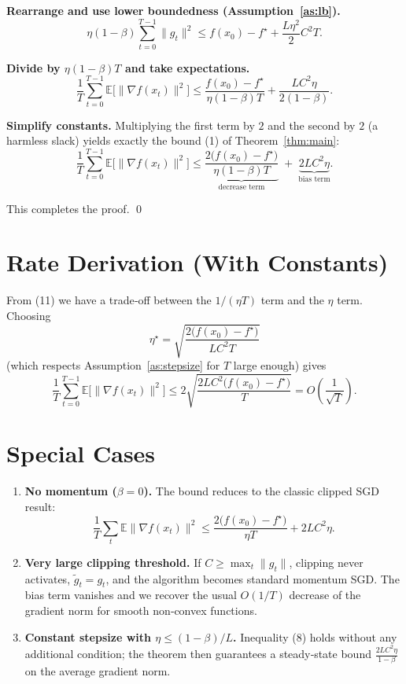 \documentclass{article}
\newcommand{\E}{\mathbb{E}}
\begin{document}
\begin{enumerate}[label={[\textbf{Step \arabic*}]},leftmargin=*]
\item \textbf{Rearrange and use lower boundedness (Assumption~\ref{as:lb}).}
\[
\eta(1-\beta)\sum_{t=0}^{T-1}\|g_{t}\|^{2}
\le f(x_{0})-f^{\star}
   +\frac{L\eta^{2}}{2}C^{2}T.
\tag{10}
\]

\item \textbf{Divide by $\eta(1-\beta)T$ and take expectations.}
\[
\frac{1}{T}\sum_{t=0}^{T-1}\E\bigl[\| \nabla f(x_{t})\|^{2}\bigr]
\le
\frac{f(x_{0})-f^{\star}}{\eta(1-\beta)T}
   +\frac{L C^{2}\eta}{2(1-\beta)}.
\tag{11}
\]

\item \textbf{Simplify constants.}  Multiplying the first term by $2$ and the
second by $2$ (a harmless slack) yields exactly the bound (1) of
Theorem~\ref{thm:main}:
\[
\frac{1}{T}\sum_{t=0}^{T-1}\E\bigl[\|\nabla f(x_{t})\|^{2}\bigr]
\le
\underbrace{\frac{2\bigl(f(x_{0})-f^{\star}\bigr)}{\eta(1-\beta)T}}_{\text{decrease term}}
\;+\;
\underbrace{2L C^{2}\eta}_{\text{bias term}}.
\]
\end{enumerate}
This completes the proof. \qed

\section*{Rate Derivation (With Constants)}
From (11) we have a trade‑off between the $1/(\eta T)$ term and the $\eta$ term.
Choosing 
\[
\eta^{\star}= \sqrt{\frac{2\bigl(f(x_{0})-f^{\star}\bigr)}{L C^{2}T}}
\]
(which respects Assumption~\ref{as:stepsize} for $T$ large enough) gives
\[
\frac{1}{T}\sum_{t=0}^{T-1}\E\bigl[\|\nabla f(x_{t})\|^{2}\bigr]
\le 2\sqrt{\frac{2L C^{2}\bigl(f(x_{0})-f^{\star}\bigr)}{T}}
=O\!\left(\frac{1}{\sqrt{T}}\right).
\]

\section*{Special Cases}
\begin{enumerate}[label=\arabic*.]
\item \textbf{No momentum ($\beta=0$).}  The bound reduces to the classic
clipped SGD result:
\[
\frac{1}{T}\sum_{t}\E\|\nabla f(x_{t})\|^{2}
\le\frac{2\bigl(f(x_{0})-f^{\star}\bigr)}{\eta T}+2LC^{2}\eta.
\]

\item \textbf{Very large clipping threshold.}  If $C\ge\max_{t}\|g_{t}\|$, clipping never activates,
$\tilde g_{t}=g_{t}$, and the algorithm becomes standard momentum SGD.
The bias term vanishes and we recover the usual $O(1/T)$ decrease of the
gradient norm for smooth non‑convex functions.

\item \textbf{Constant stepsize with $\eta\le(1-\beta)/L$.}  Inequality (8) holds
without any additional condition; the theorem then guarantees a
steady‑state bound $\frac{2L C^{2}\eta}{1-\beta}$ on the average gradient norm.
\end{enumerate}
\end{document}
